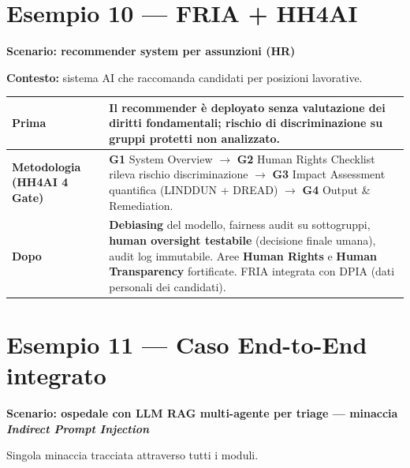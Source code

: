 \documentclass[11pt, a4paper]{article}
\begin{document}
\section*{Esempio 10 — FRIA + HH4AI}
\textbf{Scenario: recommender system per assunzioni (HR)}

\textbf{Contesto:} sistema AI che raccomanda candidati per posizioni lavorative.

\noindent
\begin{tabularx}{\textwidth}{|>{\bfseries}l|X|}
\hline
Prima & Il recommender è deployato senza valutazione dei diritti fondamentali; rischio di discriminazione su gruppi protetti non analizzato. \\ \hline
Metodologia (HH4AI 4 Gate) & \textbf{G1} System Overview $\rightarrow$ \textbf{G2} Human Rights Checklist rileva rischio discriminazione $\rightarrow$ \textbf{G3} Impact Assessment quantifica (LINDDUN + DREAD) $\rightarrow$ \textbf{G4} Output \& Remediation. \\ \hline
Dopo & \textbf{Debiasing} del modello, fairness audit su sottogruppi, \textbf{human oversight testabile} (decisione finale umana), audit log immutabile. Aree \textbf{Human Rights} e \textbf{Human Transparency} fortificate. FRIA integrata con DPIA (dati personali dei candidati). \\ \hline
\end{tabularx}

\section*{Esempio 11 — Caso End-to-End integrato}
\textbf{Scenario: ospedale con LLM RAG multi-agente per triage — minaccia \emph{Indirect Prompt Injection}}

Singola minaccia tracciata attraverso tutti i moduli.
\end{document}
